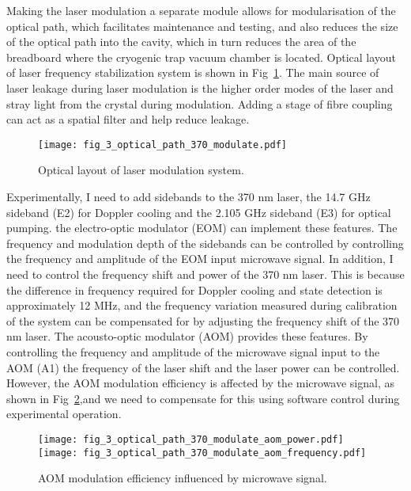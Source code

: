 Making the laser modulation a separate module allows for modularisation of the optical path, which facilitates maintenance and testing, and also reduces the size of the optical path into the cavity, which in turn reduces the area of the breadboard where the cryogenic trap vacuum chamber is located. Optical layout of laser frequency stabilization system is shown in Fig~\ref{fig:fig_3_optical_path_370_modulate}. The main source of laser leakage during laser modulation is the higher order modes of the laser and stray light from the crystal during modulation. Adding a stage of fibre coupling can act as a spatial filter and help reduce leakage.

\begin{figure}
    \centering
    \texttt{[image: fig\_3\_optical\_path\_370\_modulate.pdf]}
    \caption{Optical layout of laser modulation system.}
    \label{fig:fig_3_optical_path_370_modulate}
\end{figure}

Experimentally, I need to add sidebands to the 370 nm laser, the 14.7 GHz sideband (E2) for Doppler cooling and the 2.105 GHz sideband (E3) for optical pumping. the electro-optic modulator (EOM) can implement these features. The frequency and modulation depth of the sidebands can be controlled by controlling the frequency and amplitude of the EOM input microwave signal. In addition, I need to control the frequency shift and power of the 370 nm laser. This is because the difference in frequency required for Doppler cooling and state detection is approximately 12 MHz, and the frequency variation measured during calibration of the system can be compensated for by adjusting the frequency shift of the 370 nm laser. The acousto-optic modulator (AOM) provides these features. By controlling the frequency and amplitude of the microwave signal input to the AOM (A1) the frequency of the laser shift and the laser power can be controlled. However, the AOM modulation efficiency is affected by the microwave signal, as shown in Fig~\ref{fig:fig_3_optical_path_370_modulate_aom},and we need to compensate for this using software control during experimental operation.

\begin{figure}
    \centering
    {\texttt{[image: fig\_3\_optical\_path\_370\_modulate\_aom\_power.pdf]}}
    {\texttt{[image: fig\_3\_optical\_path\_370\_modulate\_aom\_frequency.pdf]}}
    \caption{AOM modulation efficiency influenced by microwave signal.}
    \label{fig:fig_3_optical_path_370_modulate_aom}
\end{figure}

